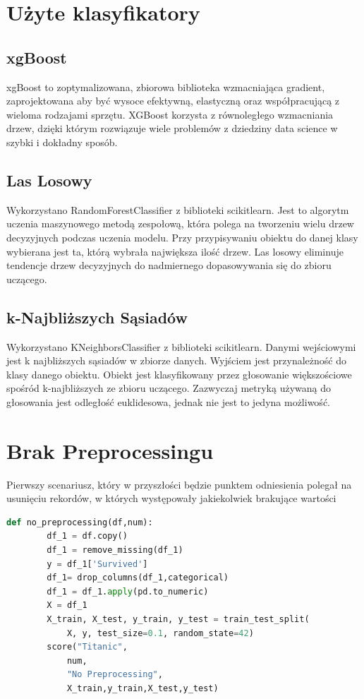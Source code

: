 \documentclass{book}
\begin{document}
\section{Użyte klasyfikatory}
\subsection{xgBoost}
xgBoost to zoptymalizowana, zbiorowa biblioteka wzmacniająca gradient, zaprojektowana aby być wysoce
efektywną, elastyczną oraz współpracującą z wieloma rodzajami sprzętu. XGBoost korzysta z równoległego wzmacniania drzew, 
dzięki którym rozwiązuje wiele problemów z dziedziny data science w szybki i dokładny sposób. \cite{xgBoost}

\subsection{Las Losowy}
Wykorzystano RandomForestClassifier z biblioteki scikit\-learn. 
Jest to algorytm uczenia maszynowego metodą zespołową, 
która polega na tworzeniu wielu drzew decyzyjnych podczas 
uczenia modelu. Przy przypisywaniu obiektu do danej klasy wybierana
jest ta, którą wybrała największa ilość drzew. Las losowy eliminuje 
tendencje drzew decyzyjnych do nadmiernego dopasowywania się do zbioru
uczącego.

\subsection{k-Najbliższych Sąsiadów}
Wykorzystano KNeighborsClassifier z biblioteki 
scikit\-learn. Danymi wejściowymi jest k 
najbliższych sąsiadów w zbiorze danych. Wyjściem 
jest przynależność do klasy danego obiektu. Obiekt 
jest klasyfikowany przez głosowanie większościowe 
spośród k-najbliższych ze zbioru uczącego. Zazwyczaj 
metryką używaną do głosowania jest odległość euklidesowa, 
jednak nie jest to jedyna możliwość.

\section{Brak Preprocessingu}
Pierwszy scenariusz, który w przyszłości 
będzie punktem odniesienia polegał na usunięciu rekordów, 
w których występowały jakiekolwiek brakujące wartości

\begin{lstlisting}[language=Python, caption={Brak przygotowania
     danych dla zbioru danych Titanic}, captionpos=b]
    def no_preprocessing(df,num):
        df_1 = df.copy()
        df_1 = remove_missing(df_1)
        y = df_1['Survived']
        df_1= drop_columns(df_1,categorical)
        df_1 = df_1.apply(pd.to_numeric)
        X = df_1
        X_train, X_test, y_train, y_test = train_test_split(
            X, y, test_size=0.1, random_state=42)
        score("Titanic",
            num,
            "No Preprocessing",
            X_train,y_train,X_test,y_test)
    \end{lstlisting}
\end{document}
